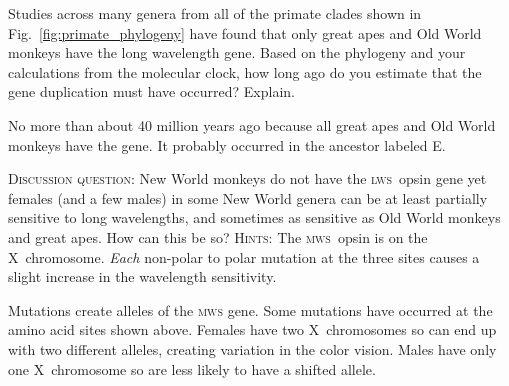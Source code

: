 \documentclass[12pt, addpoints]{exam}
\newcommand{\mws}{\textsc{mws}}
\newcommand{\lws}{\textsc{lws}}
\newcommand*\AnswerBox[2]{%
    \parbox[t][#1]{0.92\linewidth}{%
    \begin{solution}#2\end{solution}}
    \vspace{\stretch{1}}
}
\begin{document}
\begin{questions}
\question
Studies across many genera from all of the primate clades shown in Fig.~\ref{fig:primate_phylogeny} have found that only great apes and Old World monkeys have the long wavelength gene. Based on the phylogeny and your calculations from the molecular clock, how long ago do you estimate that the gene duplication must have occurred?  Explain.

\AnswerBox{0.3\textheight}{No more than about 40 million years ago because all great apes and Old World monkeys have the gene. It probably occurred in the ancestor labeled E.}

\question
\textsc{Discussion question:} New World monkeys do not have the \lws{}~opsin gene yet females (and a few males) in some New World genera can be at least partially sensitive to long wavelengths, and sometimes as sensitive as Old World monkeys and great apes.  How can this be so? \textsc{Hints:} The \mws{}~opsin is on the X~chromosome. \emph{Each} non-polar to polar mutation at the three sites causes a slight increase in the wavelength sensitivity.

\AnswerBox{0.3\textheight}{Mutations create alleles of the \mws{} gene. Some mutations have occurred at the amino acid sites shown above. Females have two X~chromosomes so can end up with two different alleles, creating variation in the color vision. Males have only one X~chromosome so are less likely to have a shifted allele.}

\label{last_page}\end{questions}
\end{document}
